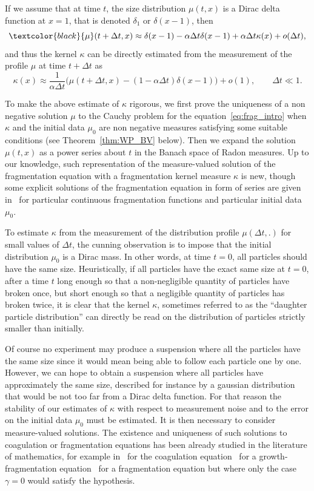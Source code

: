 \documentclass[AHL,Unicode,longabstracts,published]{cedram}
\renewcommand*\a{\alpha}
\begin{document}
If we assume that at time $t$, the size distribution $\mu (t,x)$ is a Dirac delta function at $x= 1$, that is denoted $\delta_1$ or $\delta(x-1)$, then
\begin{equation*}
\textcolor{black}{\mu }(t+\Delta t,x)\approx \delta(x-1) -\a \Delta t \delta(x-1) + \alpha \Delta t \kappa(x) +o(\Delta t),
\end{equation*}
and thus the kernel $\kappa$ can be directly estimated from the measurement of the profile $\mu $ at time $t+\Delta t$ as
\begin{equation*}
\kappa(x) \approx \dfrac{1}{\a \Delta t}\big(\mu (t+\Delta t,x) - (1-\a \Delta t) \delta(x-1)\big) +o(1), \qquad \Delta t \ll 1.
\end{equation*}

To make the above estimate of $\kappa$ rigorous, we first prove the uniqueness of a non negative solution $\mu $ to the Cauchy problem for the equation~\eqref{eq:frag_intro} when $\kappa$ and the initial data $\mu_0$ are non negative measures satisfying some suitable conditions (see Theorem~\ref{thm:WP_BV} below). Then we expand the solution $\mu(t,x)$ as a power series about $t$ in the Banach space of Radon measures. Up to our knowledge, such representation of the measure-valued solution of the fragmentation equation with a fragmentation kernel measure $\kappa$ is new, though some explicit solutions of the fragmentation equation in form of series are given in~\cite{ZiffMcGrady85, ZiffMcGrady86} for particular continuous fragmentation functions and particular initial data $\mu _0$.


To estimate $\kappa$ from the measurement of the distribution profile $\mu (\Delta t,.)$ for small values of $\Delta t$, the cunning observation is to impose that the initial distribution $\mu_0$ is a Dirac mass. In other words, at time $t=0$, all particles should have the same size. Heuristically, if all particles have the exact same size at $t=0$, after a time $t$ long enough so that a non-negligible quantity of particles have broken once, but short enough so that a negligible quantity of particles has broken twice, it is clear that the kernel $\kappa$, sometimes referred to as the ``daughter particle distribution'' can directly be read on the distribution of particles strictly smaller than initially.

Of course no experiment may produce a suspension where all the particles have the same size since it would mean being able to follow each particle one by one. However, we can hope to obtain a suspension where all particles have approximately the same size, described for instance by a gaussian distribution that would be not too far from a Dirac delta function. For that reason the stability of our estimates of $\kappa$ with respect to measurement noise and to the error on the initial data $\mu _0$ must be estimated. It is then necessary to consider measure-valued solutions. The existence and uniqueness of such solutions to coagulation or fragmentation equations has been already studied in the literature of mathematics, for example in~\cite{Bertoin1,Norris} for the coagulation equation~\cite{BCGM,BW} for a growth-fragmentation equation~\cite{CCGU} for a fragmentation equation but where only the case $\gamma =0$ would satisfy the hypothesis.
\end{document}

